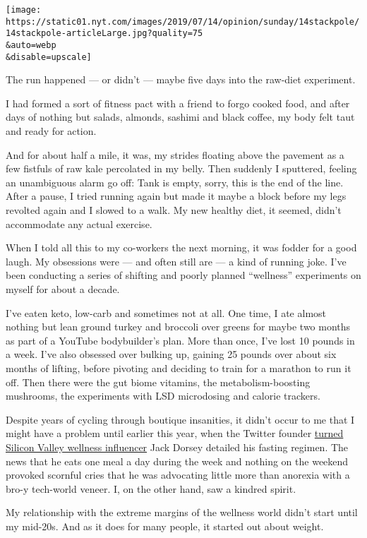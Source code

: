 \texttt{[image: https://static01.nyt.com/images/2019/07/14/opinion/sunday/14stackpole/14stackpole-articleLarge.jpg?quality=75\\\&auto=webp\\\&disable=upscale]}

The run happened --- or didn't --- maybe five days into the raw-diet
experiment.

I had formed a sort of fitness pact with a friend to forgo cooked food,
and after days of nothing but salads, almonds, sashimi and black coffee,
my body felt taut and ready for action.

And for about half a mile, it was, my strides floating above the
pavement as a few fistfuls of raw kale percolated in my belly. Then
suddenly I sputtered, feeling an unambiguous alarm go off: Tank is
empty, sorry, this is the end of the line. After a pause, I tried
running again but made it maybe a block before my legs revolted again
and I slowed to a walk. My new healthy diet, it seemed, didn't
accommodate any actual exercise.

When I told all this to my co-workers the next morning, it was fodder
for a good laugh. My obsessions were --- and often still are --- a kind
of running joke. I've been conducting a series of shifting and poorly
planned ``wellness'' experiments on myself for about a decade.

I've eaten keto, low-carb and sometimes not at all. One time, I ate
almost nothing but lean ground turkey and broccoli over greens for maybe
two months as part of a YouTube bodybuilder's plan. More than once, I've
lost 10 pounds in a week. I've also obsessed over bulking up, gaining 25
pounds over about six months of lifting, before pivoting and deciding to
train for a marathon to run it off. Then there were the gut biome
vitamins, the metabolism-boosting mushrooms, the experiments with LSD
microdosing and calorie trackers.

Despite years of cycling through boutique insanities, it didn't occur to
me that I might have a problem until earlier this year, when the Twitter
founder
\href{https://www.nytimes.com/2019/05/02/fashion/jack-dorsey-influencer.html}{turned
Silicon Valley wellness influencer} Jack Dorsey detailed his fasting
regimen. The news that he eats one meal a day during the week and
nothing on the weekend provoked scornful cries that he was advocating
little more than anorexia with a bro-y tech-world veneer. I, on the
other hand, saw a kindred spirit.

My relationship with the extreme margins of the wellness world didn't
start until my mid-20s. And as it does for many people, it started out
about weight.

